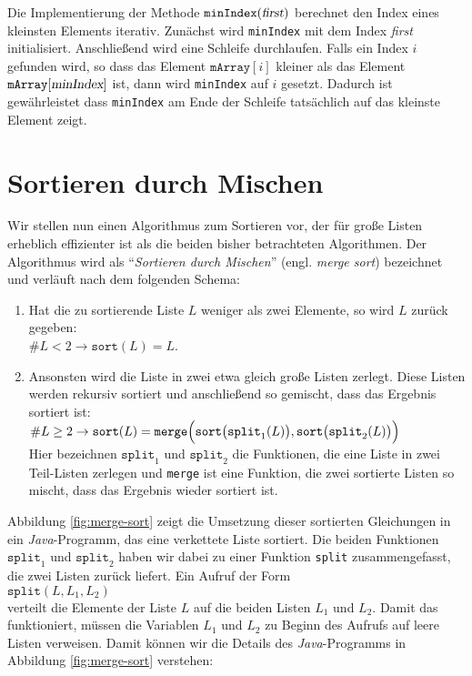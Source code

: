 Die Implementierung der Methode $\texttt{minIndex}(\textsl{first})$ berechnet den Index eines kleinsten
Elements iterativ.  Zun\"achst wird \texttt{minIndex} mit dem Index \textsl{first}
initialisiert.  Anschlie\ss{}end wird eine Schleife durchlaufen.  Falls ein
Index $i$ gefunden wird, so dass das Element $\mathtt{mArray}[i]$ kleiner als das Element
$\texttt{mArray}[\textsl{minIndex}]$ ist, dann wird \texttt{minIndex} auf $i$ gesetzt.
Dadurch ist gew\"ahrleistet dass \texttt{minIndex} am Ende der Schleife tats\"achlich auf das
kleinste Element zeigt.
\pagebreak

\section{Sortieren durch Mischen}
Wir stellen nun einen Algorithmus zum Sortieren vor, der f\"ur gro\ss{}e Listen erheblich
effizienter ist als die beiden bisher betrachteten Algorithmen.  Der Algorithmus wird als
``\emph{Sortieren durch Mischen}'' (engl. \emph{merge sort}) bezeichnet und verl\"auft nach dem folgenden Schema:
\begin{enumerate}
\item Hat die zu sortierende Liste $L$ weniger als zwei Elemente, so wird $L$ zur\"uck
      gegeben: \\[0.1cm]
      \hspace*{1.3cm} $\#L < 2 \rightarrow \mathtt{sort}(L) = L$.
\item Ansonsten wird die Liste in zwei etwa gleich gro\ss{}e Listen zerlegt.
      Diese Listen werden rekursiv sortiert und anschlie\ss{}end so gemischt, dass
      das Ergebnis sortiert ist: \\[0.1cm]
      \hspace*{1.3cm} 
 $\#L \geq 2 \rightarrow \mathtt{sort}(L) = \mathtt{merge}\Bigl(\mathtt{sort}\bigl(\mathtt{split}_1(L)\bigr), \mathtt{sort}\bigl(\mathtt{split}_2(L)\bigr)\Bigr)$
     \\[0.1cm]
     Hier bezeichnen $\texttt{split}_1$ und $\mathtt{split}_2$ die Funktionen, die eine Liste in zwei Teil-Listen zerlegen
     und \texttt{merge} ist eine Funktion, die zwei sortierte Listen so mischt, dass das Ergebnis wieder sortiert ist.
\end{enumerate}
Abbildung \ref{fig:merge-sort} zeigt die Umsetzung dieser sortierten Gleichungen 
in ein \textsl{Java}-Programm, das eine verkettete Liste sortiert. 
Die beiden Funktionen $\mathtt{split}_1$ und $\mathtt{split}_2$ haben wir dabei
zu einer Funktion \texttt{split} zusammengefasst, die zwei Listen zur\"uck liefert. Ein
Aufruf der Form
\\[0.2cm]
\hspace*{1.3cm}
$\mathtt{split}(L, L_1, L_2)$
\\[0.2cm]
verteilt die Elemente der Liste $L$ auf die beiden Listen $L_1$ und $L_2$.  
Damit das funktioniert, m\"ussen die Variablen $L_1$ und $L_2$ zu Beginn des Aufrufs auf
leere Listen verweisen.  Damit k\"onnen wir die Details des \textsl{Java}-Programms in
Abbildung \ref{fig:merge-sort} verstehen:



